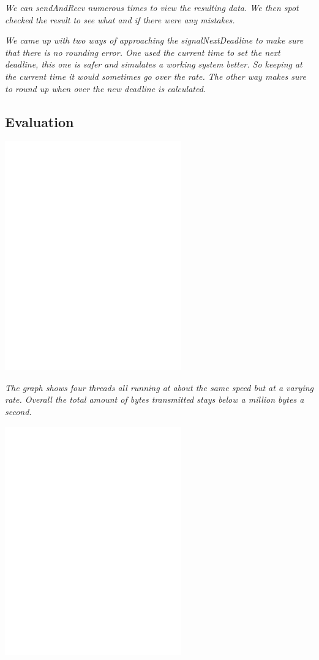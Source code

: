 \documentclass[11pt, letterpaper]{article}
\begin{document}
{\em We can sendAndRecv numerous times to view the resulting data. We then spot checked the result to see what and if there were any mistakes. }

{\em We came up with two ways of approaching the signalNextDeadline to make sure that there is no rounding error. One used the current time to set the next deadline, this one is safer and simulates a working system better. So keeping at the current time it would sometimes go over the rate. The other way makes sure to round up when over the new deadline is calculated. }


\subsection{Evaluation}

\centerline{\includegraphics[width=3in]{plot2}}

{\em The graph shows four threads all running at about the same speed but at a varying rate. Overall the total amount of bytes transmitted stays below a million bytes a second. }


\centerline{\includegraphics[width=3in]{plot2b}}
\end{document}

